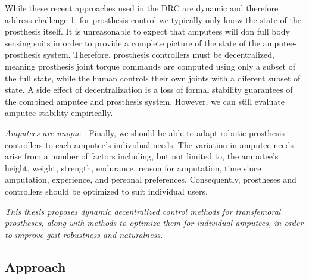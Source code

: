 \begin{challenges}
    While these recent approaches used in the DRC are dynamic and therefore
    address challenge 1, for prosthesis control we typically only know the state
    of the prosthesis itself. It is unreasonable to expect that amputees will
    don full body sensing suits in order to provide a complete picture of the
    state of the amputee-prosthesis system. Therefore, prosthesis controllers
    must be decentralized, meaning prosthesis joint torque commands are computed
    using only a subset of the full state, while the human controls their own
    joints with a diferent subset of state. A side effect of decentralization is
    a loss of formal stability guarantees of the combined amputee and prosthesis
    system. However, we can still evaluate amputee stability empirically.

    \item\label{chal:amputees_unique} \emph{Amputees are unique}~~Finally, we
    should be able to adapt robotic prosthesis controllers to each amputee's
    individual needs. The variation in amputee needs arise from a number of
    factors including, but not limited to, the amputee's height, weight,
    strength, endurance, reason for amputation, time since amputation,
    experience, and personal preferences. Consequently, prostheses and
    controllers should be optimized to suit individual users.
\end{challenges}

\vspace{2ex}
\begin{fullwidth} \emph{This thesis proposes dynamic decentralized control
methods for transfemoral prostheses, along with methods to optimize them for
individual amputees, in order to improve gait robustness and naturalness.}
\end{fullwidth}

\subsection{Approach}\label{sec:intro_approach}

